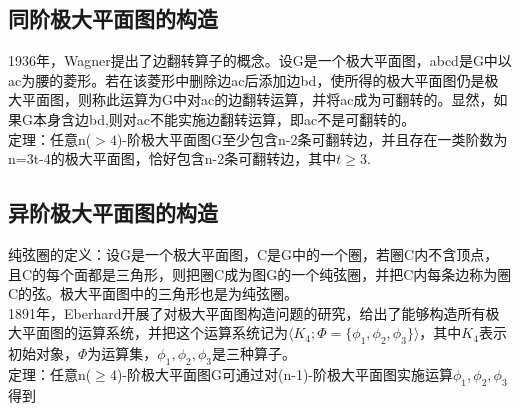 \documentclass[12pt, UTF8]{ctexart}
\begin{document}
\subsection{同阶极大平面图的构造}
1936年，Wagner提出了边翻转算子的概念。设G是一个极大平面图，abcd是G中以ac为腰的菱形。若在该菱形中删除边ac后添加边bd，使所得的极大平面图仍是极大平面图，则称此运算为G中对ac的边翻转运算，并将ac成为可翻转的。显然，如果G本身含边bd,则对ac不能实施边翻转运算，即ac不是可翻转的。\\
定理：任意n($> 4$)-阶极大平面图G至少包含n-2条可翻转边，并且存在一类阶数为n=3t-4的极大平面图，恰好包含n-2条可翻转边，其中$t \ge 3$.\\


\subsection{异阶极大平面图的构造}
纯弦圈的定义：设G是一个极大平面图，C是G中的一个圈，若圈C内不含顶点，且C的每个面都是三角形，则把圈C成为图G的一个纯弦圈，并把C内每条边称为圈C的弦。极大平面图中的三角形也是为纯弦圈。\\
1891年，Eberhard开展了对极大平面图构造问题的研究，给出了能够构造所有极大平面图的运算系统，并把这个运算系统记为$\langle K_4;\Phi=\{\phi_1,\phi_2,\phi_3\}\rangle$，其中$K_4$表示初始对象，$\Phi$为运算集，$\phi_1,\phi_2,\phi_3$是三种算子。\\
定理：任意n($\ge 4$)-阶极大平面图G可通过对(n-1)-阶极大平面图实施运算$\phi_1,\phi_2,\phi_3$得到
\end{document}
